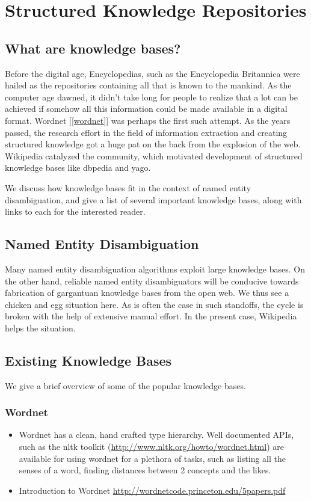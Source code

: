\section{Structured Knowledge Repositories}
 \label{seckb}
\subsection{What are knowledge bases?}
Before the digital age, Encyclopedias, such as the Encyclopedia Britannica were hailed as the repositories containing
all that is known to the mankind. As the computer age dawned, it didn't take long for people to realize that a lot
can be achieved if somehow all this information could be made available in a digital format.
Wordnet [\ref{wordnet}] was perhaps the first such attempt. As the years passed, the research effort in the field of information extraction and creating 
structured knowledge got a huge pat on the back from the explosion of the web. Wikipedia catalyzed the community, which motivated development 
of structured knowledge bases like dbpedia and yago.

We discuss how knowledge bases fit in the context of named entity disambiguation, and give a list of several
important knowledge bases, along with links to each for the interested reader.

\subsection{Named Entity Disambiguation}

Many named entity disambiguation algorithms exploit large knowledge bases.
On the other hand, reliable named entity disambiguators will be conducive towards
fabrication of gargantuan knowledge bases from the open web. We thus see 
a chicken and egg situation here. As is often the case in such standoffs, the cycle is
broken with the help of extensive manual effort. In the present case, Wikipedia helps the
situation.


\subsection{Existing Knowledge Bases}
We give a brief overview of some of the popular knowledge bases.
\subsubsection{Wordnet}
\begin{itemize}
 \item Wordnet has a clean, hand crafted type hierarchy. Well documented APIs, such as the nltk toolkit
(\url{http://www.nltk.org/howto/wordnet.html}) are available for using wordnet for a 
plethora of tasks, such as listing all the senses of a word, finding distances between 
2 concepts and the likes.
 \item Introduction to Wordnet \url{http://wordnetcode.princeton.edu/5papers.pdf}
\end{itemize}

